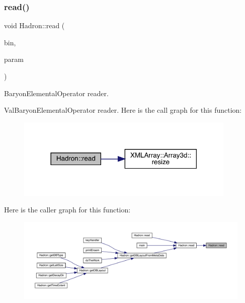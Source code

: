\subsubsection{\texorpdfstring{read()}{read()}\hspace{0.1cm}{\footnotesize\ttfamily [63/94]}}
{\footnotesize\ttfamily void Hadron\+::read (\begin{DoxyParamCaption}\item[{\mbox{\hyperlink{classADATIO_1_1BinaryReader}{Binary\+Reader}} \&}]{bin,  }\item[{\mbox{\hyperlink{structHadron_1_1ValBaryonElementalOperator__t}{Val\+Baryon\+Elemental\+Operator\+\_\+t}} \&}]{param }\end{DoxyParamCaption})}



Baryon\+Elemental\+Operator reader. 

Val\+Baryon\+Elemental\+Operator reader. Here is the call graph for this function\+:\nopagebreak
\begin{figure}[H]
\begin{center}
\leavevmode
\includegraphics[width=297pt]{d1/daf/namespaceHadron_ae87d364dcd64ddf5c60a1b4d6237e633_cgraph}
\end{center}
\end{figure}
Here is the caller graph for this function\+:\nopagebreak
\begin{figure}[H]
\begin{center}
\leavevmode
\includegraphics[width=350pt]{d1/daf/namespaceHadron_ae87d364dcd64ddf5c60a1b4d6237e633_icgraph}
\end{center}
\end{figure}
\mbox{\label{namespaceHadron_aa192df4bf85988ad36b7c9b7c0c83dd3}} 
